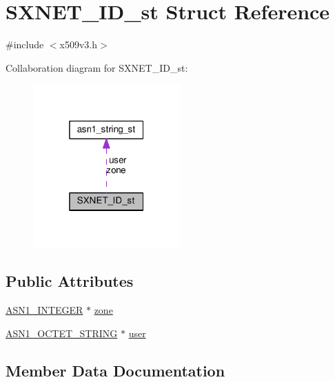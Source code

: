 \hypertarget{struct_s_x_n_e_t___i_d__st}{}\section{S\+X\+N\+E\+T\+\_\+\+I\+D\+\_\+st Struct Reference}
\label{struct_s_x_n_e_t___i_d__st}


{\ttfamily \#include $<$x509v3.\+h$>$}



Collaboration diagram for S\+X\+N\+E\+T\+\_\+\+I\+D\+\_\+st\+:
\nopagebreak
\begin{figure}[H]
\begin{center}
\leavevmode
\includegraphics[width=160pt]{struct_s_x_n_e_t___i_d__st__coll__graph}
\end{center}
\end{figure}
\subsection*{Public Attributes}
\begin{DoxyCompactItemize}
\item 
\hyperlink{ossl__typ_8h_af4335399bf9774cb410a5e93de65998b}{A\+S\+N1\+\_\+\+I\+N\+T\+E\+G\+ER} $\ast$ \hyperlink{struct_s_x_n_e_t___i_d__st_a37185a622f9b0cb3e0384652be7b9215}{zone}
\item 
\hyperlink{ossl__typ_8h_afbd05e94e0f0430a2b729473efec88c1}{A\+S\+N1\+\_\+\+O\+C\+T\+E\+T\+\_\+\+S\+T\+R\+I\+NG} $\ast$ \hyperlink{struct_s_x_n_e_t___i_d__st_aa72978d5a59bbe0df0bb2d5190c30348}{user}
\end{DoxyCompactItemize}


\subsection{Member Data Documentation}
